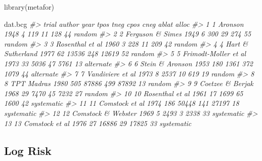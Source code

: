 \documentclass[
]{book}
\newenvironment{Shaded}{\begin{snugshade}}{\end{snugshade}}
\newcommand{\CommentTok}[1]{\textcolor[rgb]{0.56,0.35,0.01}{\textit{#1}}}
\newcommand{\FunctionTok}[1]{\textcolor[rgb]{0.00,0.00,0.00}{#1}}
\newcommand{\NormalTok}[1]{#1}
\begin{document}
\begin{Shaded}
\begin{Highlighting}[]
\FunctionTok{library}\NormalTok{(metafor)}

\NormalTok{dat.bcg}
\CommentTok{\#\textgreater{}    trial               author year tpos  tneg cpos  cneg ablat      alloc}
\CommentTok{\#\textgreater{} 1      1              Aronson 1948    4   119   11   128    44     random}
\CommentTok{\#\textgreater{} 2      2     Ferguson \& Simes 1949    6   300   29   274    55     random}
\CommentTok{\#\textgreater{} 3      3      Rosenthal et al 1960    3   228   11   209    42     random}
\CommentTok{\#\textgreater{} 4      4    Hart \& Sutherland 1977   62 13536  248 12619    52     random}
\CommentTok{\#\textgreater{} 5      5 Frimodt{-}Moller et al 1973   33  5036   47  5761    13  alternate}
\CommentTok{\#\textgreater{} 6      6      Stein \& Aronson 1953  180  1361  372  1079    44  alternate}
\CommentTok{\#\textgreater{} 7      7     Vandiviere et al 1973    8  2537   10   619    19     random}
\CommentTok{\#\textgreater{} 8      8           TPT Madras 1980  505 87886  499 87892    13     random}
\CommentTok{\#\textgreater{} 9      9     Coetzee \& Berjak 1968   29  7470   45  7232    27     random}
\CommentTok{\#\textgreater{} 10    10      Rosenthal et al 1961   17  1699   65  1600    42 systematic}
\CommentTok{\#\textgreater{} 11    11       Comstock et al 1974  186 50448  141 27197    18 systematic}
\CommentTok{\#\textgreater{} 12    12   Comstock \& Webster 1969    5  2493    3  2338    33 systematic}
\CommentTok{\#\textgreater{} 13    13       Comstock et al 1976   27 16886   29 17825    33 systematic}
\end{Highlighting}
\end{Shaded}

\hypertarget{log-risk}{%
\subsection{Log Risk}\label{log-risk}}
\end{document}

